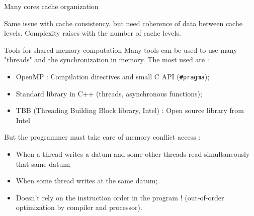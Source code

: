 \documentclass[compress,10pt,aspectratio=169]{beamer}
\begin{document}
\begin{frame}[fragile]{Many cores cache organization}
\begin{center}
        \end{center}
        
        Same issue with cache consistency, but need coherence of data between cache levels. Complexity raises with the number of 
        cache levels.
        
        \end{frame}


\begin{frame}[fragile]{Tools for shared memory computation}
\small
Many tools can be used to use many "threads" and the synchronization in memory. The most used are :

\begin{itemize}
  \item OpenMP : Compilation directives and small C API (\texttt{#pragma});
  \item Standard library in C++ (threads, asynchronous functions);
  \item TBB (Threading Building Block library, Intel) : Open source library from Intel
  \end{itemize}
 
But the programmer must take care of memory conflict access :
\begin{itemize}
    \item When a thread writes a datum and some other threads read simultaneously that same datum;
    \item When some thread writes at the same datum;
    \item Doesn't rely on the instruction order in the program ! (out-of-order optimization by compiler and processor).
\end{itemize}
\end{frame}
\end{document}
